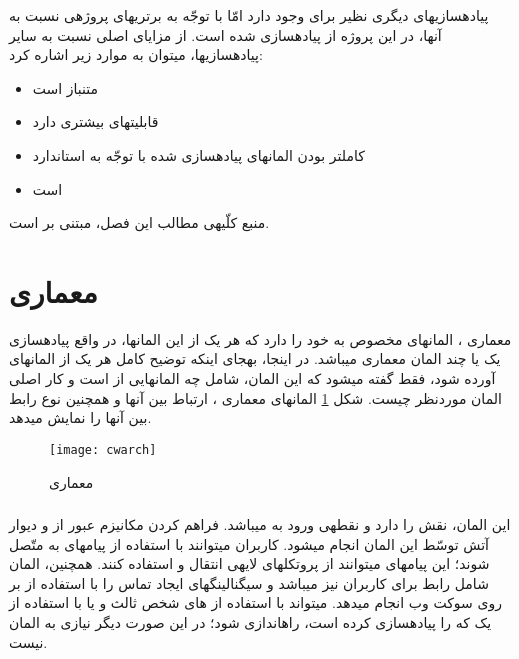 پیاده\nf سازی\nf های دیگری نظیر \cite{webopenims} برای  وجود دارد امّا با توجّه به برتری\nf های پروژه\nf ی  نسبت به آن\nf ها، در این پروژه از پیاده\nf سازی  شده است. از مزایای اصلی  نسبت به سایر پیاده\nf سازی\nf ها، می\nf توان به موارد زیر اشاره کرد:
\begin{itemize}
\item متن\nf باز است
\item قابلیت\nf های بیشتری دارد
\item کامل\nf تر بودن المان\nf های پیاده\nf سازی شده با توجّه به استاندارد 
\item {} است
\end{itemize}

\noindent منبع کلّیه\nf ی مطالب این فصل، مبتنی بر \cite{webcw} است.
\nf 
\section{معماری }
معماری ، المان\nf های مخصوص به خود را دارد که هر یک از این المان\nf ها، در واقع پیاده\nf سازی یک یا چند المان معماری  می\nf باشد. در اینجا، به\nf جای این\nf که  توضیح کامل هر یک از المان\nf های  آورده شود، فقط گفته می\nf شود که این المان، شامل چه المان\nf هایی از  است و کار اصلی المان موردنظر چیست. شکل \ref{cwarch} المان\nf های معماری ، ارتباط بین آن\nf ها و همچنین نوع رابط بین آن\nf ها را نمایش می\nf دهد.

\begin{figure}[h]
\centering
\texttt{[image: cwarch]}
\caption{معماری }
\label{cwarch}
\end{figure}

\subsubsection{}
این المان، نقش  را دارد و نقطه\nf ی ورود به  می\nf باشد. فراهم کردن مکانیزم عبور از  و دیوار آتش توسّط این المان انجام می\nf شود. کاربران می\nf توانند با استفاده از پیام\nf های  به  متّصل شوند؛ این پیام\nf های  می\nf توانند از پروتکل\nf های لایه\nf ی انتقال  و  استفاده کنند.  همچنین، المان  شامل رابط  برای کاربران نیز می\nf باشد و سیگنالینگ\nf های ایجاد تماس را با استفاده از  بر روی سوکت وب انجام می\nf دهد.  می\nf تواند با استفاده از های شخص ثالث و یا با استفاده از یک که  را پیاده\nf سازی کرده است، راه\nf اندازی شود؛ در این صورت دیگر نیازی به المان  نیست.



